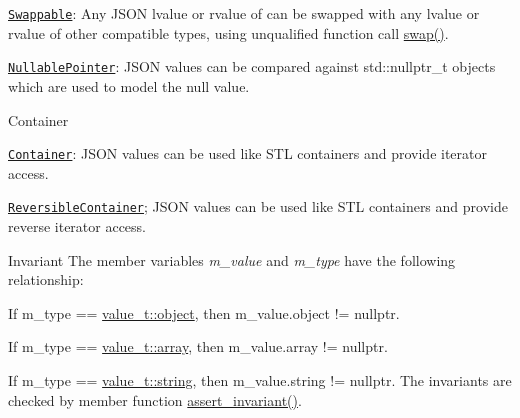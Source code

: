 \begin{DoxyItemize}
\begin{DoxyItemize}
\item \href{https://en.cppreference.com/w/cpp/named_req/Swappable}{\tt Swappable}\+: Any J\+S\+ON lvalue or rvalue of can be swapped with any lvalue or rvalue of other compatible types, using unqualified function call \hyperlink{classnlohmann_1_1basic__json_a66d4de311f79f2fe640793ab7a178781}{swap()}.
\item \href{https://en.cppreference.com/w/cpp/named_req/NullablePointer}{\tt Nullable\+Pointer}\+: J\+S\+ON values can be compared against {\ttfamily std\+::nullptr\+\_\+t} objects which are used to model the {\ttfamily null} value.
\end{DoxyItemize}
\item Container
\begin{DoxyItemize}
\item \href{https://en.cppreference.com/w/cpp/named_req/Container}{\tt Container}\+: J\+S\+ON values can be used like S\+TL containers and provide iterator access.
\item \href{https://en.cppreference.com/w/cpp/named_req/ReversibleContainer}{\tt Reversible\+Container}; J\+S\+ON values can be used like S\+TL containers and provide reverse iterator access.
\end{DoxyItemize}
\end{DoxyItemize}

\begin{DoxyInvariant}{Invariant}
The member variables {\itshape m\+\_\+value} and {\itshape m\+\_\+type} have the following relationship\+:
\begin{DoxyItemize}
\item If {\ttfamily m\+\_\+type == \hyperlink{namespacenlohmann_1_1detail_a1ed8fc6239da25abcaf681d30ace4985aa8cfde6331bd59eb2ac96f8911c4b666}{value\+\_\+t\+::object}}, then {\ttfamily m\+\_\+value.\+object != nullptr}.
\item If {\ttfamily m\+\_\+type == \hyperlink{namespacenlohmann_1_1detail_a1ed8fc6239da25abcaf681d30ace4985af1f713c9e000f5d3f280adbd124df4f5}{value\+\_\+t\+::array}}, then {\ttfamily m\+\_\+value.\+array != nullptr}.
\item If {\ttfamily m\+\_\+type == \hyperlink{namespacenlohmann_1_1detail_a1ed8fc6239da25abcaf681d30ace4985ab45cffe084dd3d20d928bee85e7b0f21}{value\+\_\+t\+::string}}, then {\ttfamily m\+\_\+value.\+string != nullptr}. The invariants are checked by member function \hyperlink{classnlohmann_1_1basic__json_a4a82d3fb7a111641decf35c2fb707c7f}{assert\+\_\+invariant()}.
\end{DoxyItemize}
\end{DoxyInvariant}



